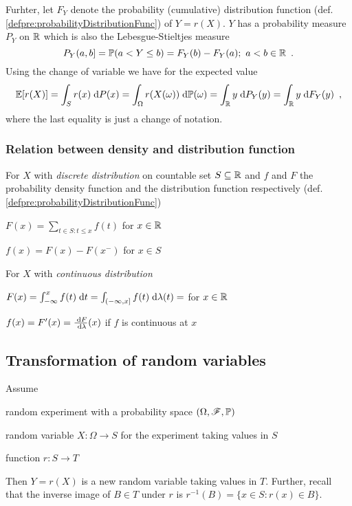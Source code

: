 Furhter, let $F_Y$ denote the probability (cumulative) distribution function (def. \ref{defpre:probabilityDistributionFunc}) of $Y = r(X)$. $Y$ has a probability measure $P_Y$ on $\mathbb{R}$ which is also the Lebesgue-Stieltjes measure 
\begin{equation}
P_Y(a,b] = \mathbb{P}(a < Y \leq b) = F_Y(b) - F_Y(a); \ a < b \in \mathbb{R} \enspace .
\end{equation}
Using the change of variable we have for the expected value
\begin{equation}
\mathbb{E}[r(X)] = \int_S r(x) \; \text{d} P(x) = \int_\Omega r(X(\omega)) \; \text{d} \mathbb{P}(\omega) = \int_{\mathbb{R}} y \; \text{d} P_Y(y) = \int_{\mathbb{R}} y \; \text{d} F_Y(y) \enspace ,
\end{equation}
where the last equality is just a change of notation.


\subsubsection{Relation between density and distribution function}\label{secpre:denstiy-distribFuncs}

For $X$ with \emph{discrete distribution} on countable set $S \subseteq \mathbb{R}$ and $f$ and $F$ the probability density function and the distribution function respectively (def. \ref{defpre:probabilityDistributionFunc})
\begin{compactitem}
\item $F(x) = \sum_{t \in S: t \leq x} f(t)$ for $x \in \mathbb{R}$
\item $f(x) = F(x) - F(x^-)$ for $x \in S$
\end{compactitem}

For $X$ with \emph{continuous distribution}
\begin{compactitem}
\item $F(x) = \int_{-\infty}^x f(t) \; \text{d} t = \int_{(-\infty,x]} f(t) \; \text{d} \lambda(t)= $ for $x \in \mathbb{R}$
\item $f(x) = F'(x) = \frac{\; \text{d} F}{\; \text{d} \lambda} (x)$ if $f$ is continuous at $x$
\end{compactitem}

\subsection{Transformation of random variables}

Assume 
\begin{compactitem}
\item random experiment with a probability space $(\Omega, \mathscr{F}, \mathbb{P})$
\item random variable $X : \Omega \to S$ for the experiment taking values in $S$
\item function $r : S \to T$
\end{compactitem}
Then $Y = r(X)$ is a new random variable taking values in $T$.
Further, recall that the inverse image of $B \in T$ under $r$ is $r^{-1}(B) = \{ x \in S: r(x) \in B\}$.

